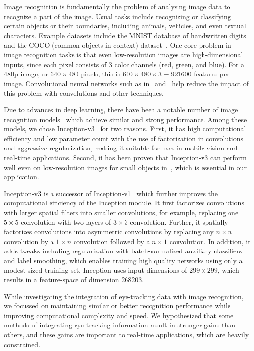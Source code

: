 Image recognition is fundamentally the problem of analysing image data to
recognize a part of the image. Usual tasks include recognizing or classifying
certain objects or their boundaries, including animals, vehicles, and even
textual characters. Example datasets include the MNIST database of handwritten
digits~\cite{Lecun_1998} and the COCO (common objects in context)
dataset~\cite{COCO}. One core problem in image recognition tasks is that even
low-resolution images are high-dimensional inputs, since each pixel consists of
3 color channels (red, green, and blue). For a 480p image, or \(640 \times 480\)
pixels, this is \(640 \times 480 \times 3 = 921600\) features per image.
Convolutional neural networks such as in~\cite{Lecun_1998}
and~\cite{Krizhevsky_2017} help reduce the impact of this problem with
convolutions and other techniques.

Due to advances in deep learning, there have been a notable number of image
recognition models~\cite{simonyan2014very, szegedy2015going,
szegedy2016rethinking, he2016deep, szegedy2017inception} which achieve similar
and strong performance. Among these models, we chose
Inception-v3~\cite{szegedy2016rethinking} for two reasons. First, it has high
computational efficiency and low parameter count with the use of factorization
in convolutions and aggressive regularization, making it suitable for uses
in mobile vision and real-time applications. Second, it has been proven that
Inception-v3 can perform well even on low-resolution images for small objects
in~\cite{szegedy2016rethinking}, which is essential in our application.

Inception-v3 is a successor of Inception-v1~\cite{szegedy2015going} which
further improves the computational efficiency of the Inception module. It first
factorizes convolutions with larger spatial filters into smaller convolutions,
for example, replacing one $5 \times 5$ convolution with two layers of $3 \times
3$ convolution. Further, it spatially factorizes convolutions into asymmetric
convolutions by replacing any $n \times n$ convolution by a $1 \times n$
convolution followed by a $n \times 1$ convolution. In addition, it adds tweaks
including regularization with batch-normalized auxiliary classifiers and label
smoothing, which enables training high quality networks using only a modest
sized training set. Inception uses input dimensions of \(299 \times 299\), which
results in a feature-space of dimension 268203.

While investigating the integration of eye-tracking data with image recognition,
we focussed on maintaining similar or better recognition performance while
improving computational complexity and speed. We hypothesized that some methods
of integrating eye-tracking information result in stronger gains than others,
and these gains are important to real-time applications, which are heavily
constrained.

